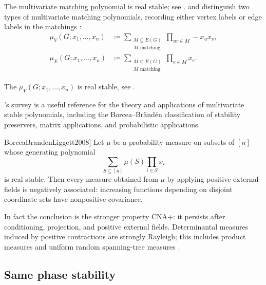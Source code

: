 \begin{example*}
The multivariate \hyperref[realRootedMatching]{matching polynomial} is real
stable; see \cite{BorceaBranden2009I,BorceaBranden2009II}.
 and  distinguish two types of
multivariate matching polynomials, recording either vertex labels or edge
labels in the matchings \cite{LeakeRyder2019}:
\begin{align}
\mu_V(G;x_1,\dotsc,x_n)
  & \coloneqq
  \sum_{\substack{M \subseteq E(G) \\ \text{$M$ matching}}}
  \prod_{uv \in M} -x_u x_v, \\
\mu_E(G;x_1,\dotsc,x_n)
  & \coloneqq
  \sum_{\substack{M \subseteq E(G) \\ \text{$M$ matching}}}
  \prod_{e \in M} x_e.
\end{align}
\end{example*}

The 
\label{multiAffineVertexMatchingPolynomial}
$\mu_V(G;x_1,\dotsc,x_n)$ is real stable, see \cite{BorceaBranden2009I}.

's survey \cite{Wagner2009StableSurvey}
is a useful reference for the theory and applications of multivariate
stable polynomials, including the Borcea--Brändén classification of
stability preservers, matrix applications, and probabilistic applications.

\begin{theorem}[Borcea--Brändén--Liggett,
\cite[Thm.~4.9]{BorceaBrandenLiggett2008}]
Let $\mu$ be a probability measure on subsets of $[n]$ whose generating
polynomial
\[
  \sum_{S\subseteq[n]}\mu(S)\prod_{i\in S}x_i
\]
is real stable.  Then every measure obtained from $\mu$ by applying
positive external fields is negatively associated: increasing functions
depending on disjoint coordinate sets have nonpositive covariance.
\end{theorem}

In fact the conclusion is the stronger property CNA+: it persists after
conditioning, projection, and positive external fields.  Determinantal
measures induced by positive contractions are strongly Rayleigh; this includes
product measures and uniform random spanning-tree measures
\cite[Prop.~3.5]{BorceaBrandenLiggett2008}.




\subsection[samePhaseStable]{Same phase stability}

